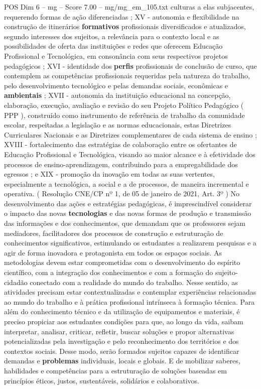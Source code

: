\begin{textsample}{POS Dim 6 – mg – Score 7.00 – mg/mg\_em\_105.txt}
culturas a elas subjacentes, requerendo formas de ação diferenciadas ; XV - autonomia e flexibilidade na construção de itinerários \textbf{formativos} profissionais diversificados e atualizados, segundo interesses dos sujeitos, a relevância para o contexto local e as possibilidades de oferta das instituições e redes que oferecem Educação Profissional e Tecnológica, em consonância com seus respectivos projetos pedagógicos ; XVI - identidade dos \textbf{perfis} profissionais de conclusão de curso, que contemplem as competências profissionais requeridas pela natureza do trabalho, pelo desenvolvimento tecnológico e pelas demandas sociais, econômicas e \textbf{ambientais} ; XVII - autonomia da instituição educacional na concepção, elaboração, execução, avaliação e revisão do seu Projeto Político Pedagógico ( PPP ), construído como instrumento de referência de trabalho da comunidade escolar, respeitadas a legislação e as normas educacionais, estas Diretrizes Curriculares Nacionais e as Diretrizes complementares de cada sistema de ensino ; XVIII - fortalecimento das estratégias de colaboração entre os ofertantes de Educação Profissional e Tecnológica, visando ao maior alcance e à efetividade dos processos de ensino-aprendizagem, contribuindo para a empregabilidade dos egressos ; e XIX - promoção da inovação em todas as suas vertentes, especialmente a tecnológica, a social e a de processos, de maneira incremental e operativa. ( Resolução CNE/CP nº 1, de 05 de janeiro de 2021, Art. 3º ) No desenvolvimento das ações e estratégias pedagógicas, é imprescindível considerar o impacto das novas \textbf{tecnologias} e das novas formas de produção e transmissão das informações e dos conhecimentos, que demandam que os professores sejam mediadores, facilitadores dos processos de construção e estruturação de conhecimentos significativos, estimulando os estudantes a realizarem pesquisas e a agir de forma inovadora e protagonista em todos os espaços sociais.
As metodologias devem estar comprometidas com o desenvolvimento do espírito científico, com a integração dos conhecimentos e com a formação do sujeito-cidadão conectado com a realidade do mundo do trabalho.
Nesse sentido, as atividades precisam estar contextualizadas e contemplar experiências relacionadas ao mundo do trabalho e à prática profissional intrínseca à formação técnica.
Para além do conhecimento técnico e da utilização de equipamentos e materiais, é preciso propiciar aos estudantes condições para que, ao longo da vida, saibam interpretar, analisar, criticar, refletir, buscar soluções e propor alternativas potencializadas pela investigação e pelo reconhecimento dos territórios e dos contextos sociais.
Desse modo, serão formados sujeitos capazes de identificar demandas e \textbf{problemas} individuais, locais e globais.
E de mobilizar saberes, habilidades e competências para a estruturação de soluções baseadas em princípios éticos, justos, sustentáveis, solidários e colaborativos.

\end{textsample}
